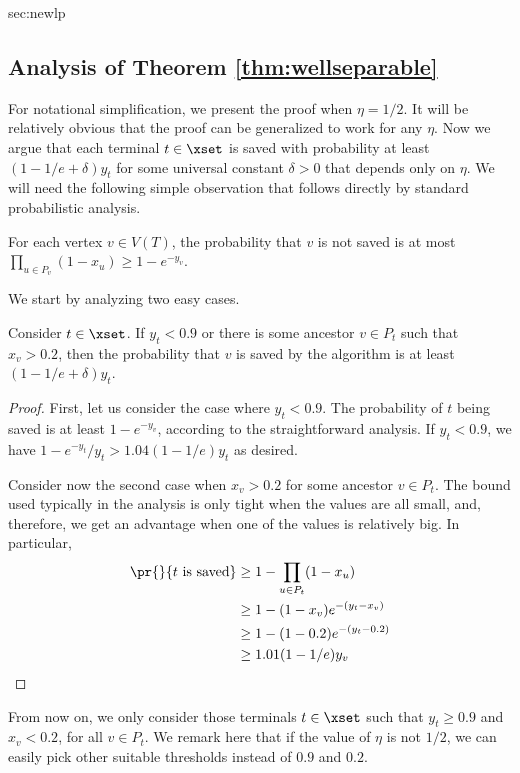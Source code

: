 \begin{appendixextra}{sec:newlp}{\subsection{Analysis of Theorem \ref{thm:wellseparable}}}

For notational simplification, we present the proof when $\eta = 1/2$. It will be relatively obvious that the proof can be generalized to work for any $\eta$.  
Now we argue that each terminal $t \in \xset$ is saved with probability at least $(1-1/e +\delta)y_t$ for some universal constant $\delta >0$ that depends only on $\eta$. 
We will need the following simple observation that follows directly by standard probabilistic analysis. 


\begin{proposition}
\label{prop:LP-frac}  
For each vertex $v \in V(T)$, the probability that $v$ is not saved is at most $\prod_{u \in P_v}(1-x_u) \geq 1- e^{-y_v}$. 
\end{proposition} 
 
We start by analyzing two easy cases.  

\begin{lemma} 
\label{newlp:specialcases}
Consider $t \in \xset$. If $y_t < 0.9$ or there is some ancestor $v \in P_t$ such that $x_v > 0.2$, then the probability that $v$ is saved by the algorithm is at least $(1-1/e+\delta) y_t$.  
\end{lemma}  
\begin{proof} 
First, let us consider the case where $y_t < 0.9$. The probability of $t$
being saved is at least $1-e^{-y_v}$, according to the straightforward analysis.
If $y_t < 0.9$, we have $1-e^{-y_t}/y_t > 1.04(1-1/e)y_t$ as desired. 

Consider now the second case when $x_v > 0.2$ for some ancestor $v \in P_t$. 
The bound used
typically in the analysis is only tight when the values are all small, and,
therefore, we get an advantage when one of the values is relatively big. In
particular,
\begin{align*}
\pr{}{t \text{ is saved}} &\geq 1 - \prod_{u \in P_t} (1-x_u) \\
&\geq 1 - (1-x_v)e^{-(y_t-x_v)} \\
&\geq 1 - (1-0.2)e^{-(y_t-0.2)} \\
&\geq 1.01(1-1/e)y_v
\end{align*}
\end{proof} 

From now on, we only consider those terminals $t \in\xset$ such that $y_t \geq 0.9$ and $x_v < 0.2$, for all $v \in
P_t$. 
We remark here that if the value of $\eta$ is not $1/2$, we can easily pick other suitable thresholds instead of $0.9$ and $0.2$.  


\end{appendixextra}
